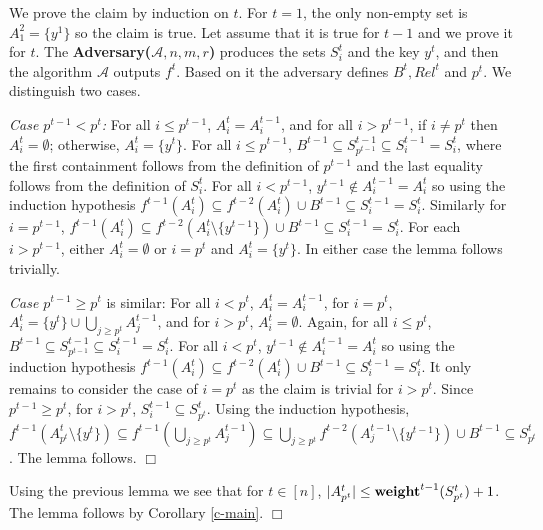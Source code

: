 \documentclass[11pt]{article}
\newcommand{\qed}{$\Box$}
\newenvironment{proof}{\noindent {\bf Proof:}}{\hfill \qed \smallskip}
\newenvironment{proofof}[1]{\noindent{\it Proof of #1. }} {{\qed}}
\newcommand{\A}{\mathcal{A}}
\newcommand{\weight}{{\rm {\bf weight}}}
\begin{document}
\begin{proof}  %
We prove the claim by induction on $t$. For $t=1$, the only non-empty set is $A^2_1=\{y^1\}$ so the claim is true.
Let assume that it is true for $t-1$ and we prove it for $t$.
The {\bf Adversary($\A,n,m,r$)} produces the sets $S^t_i$ and the key $y^t$, and then the algorithm $\A$ outputs $f^t$.
Based on it the adversary defines $B^t, Rel^t$ and $p^t$.
We distinguish two cases.

\emph{Case $p^{t-1} < p^t$:} For all $i\le p^{t-1}$, $A^{t}_i = A^{t-1}_i$, and for all $i> p^{t-1}$, if $i\not=p^t$ then $A^t_i=\emptyset$;
otherwise, $A^t_i = \{y^t\}$. For all $i\le p^{t-1}$, $B^{t-1} \subseteq S^{t-1}_{p^{t-1}} \subseteq S^{t-1}_i = S^t_i$, where
the first containment follows from the definition of $p^{t-1}$ and the last equality follows from the definition of $S^t_i$.
For all $i<p^{t-1}$, $y^{t-1} \not\in A^{t-1}_i = A^t_i$ so using the induction hypothesis
$f^{t-1}(A^t_i) \subseteq f^{t-2}(A^t_i) \cup B^{t-1} \subseteq S^{t-1}_i = S^t_i$.
Similarly for $i=p^{t-1}$, $f^{t-1}(A^t_i) \subseteq f^{t-2}(A^t_i \setminus \{y^{t-1}\}) \cup B^{t-1} \subseteq S^{t-1}_i = S^t_i$.
For each $i>p^{t-1}$, either $A^t_i = \emptyset$ or $i=p^t$ and $A^t_i=\{y^t\}$. In either case the lemma follows trivially.

\emph{Case $p^{t-1} \ge p^t$} is similar: For all $i < p^{t}$, $A^{t}_i = A^{t-1}_i$, for $i=p^t$, $A^t_i = \{y^t\} \cup \bigcup_{j\ge p^t} A^{t-1}_j$,
and for $i>p^t$, $A^t_i=\emptyset$. Again, for all $i\le p^{t}$, $B^{t-1} \subseteq S^{t-1}_{p^{t-1}} \subseteq S^{t-1}_i = S^t_i$.
For all $i<p^{t}$, $y^{t-1} \not\in A^{t-1}_i = A^t_i$ so using the induction hypothesis
$f^{t-1}(A^t_i) \subseteq f^{t-2}(A^t_i) \cup B^{t-1} \subseteq S^{t-1}_i = S^t_i$.
It only remains to consider the case of $i=p^t$ as the claim is trivial for $i>p^t$.
Since $p^{t-1} \ge p^t$, for $i>p^t$, $S^{t-1}_i \subseteq S^t_{p^t}$.
Using the induction hypothesis, $f^{t-1}(A^t_{p^t} \setminus \{y^t\}) \subseteq f^{t-1}(\bigcup_{j\ge p^t} A^{t-1}_j)
\subseteq \bigcup_{j\ge p^t} f^{t-2}( A^{t-1}_j \setminus \{y^{t-1}\}) \cup B^{t-1} \subseteq S^t_{p^t}$. The lemma follows.
\end{proof}


\begin{proofof}{Lemma \ref{l-b2l}}
Using the previous lemma we see that for $t\in [n]$, $|A^t_{p^t}| \le \weight^{t-1}(S^t_{p^t}) + 1$.
The lemma follows by Corollary \ref{c-main}.
\end{proofof}
\end{document}
